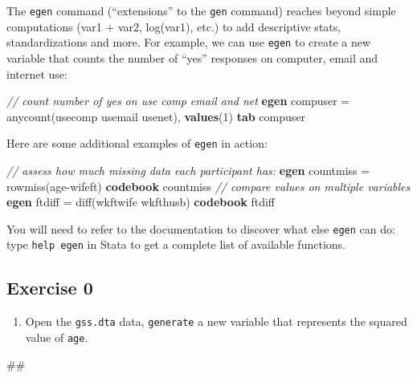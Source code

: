 \documentclass[
]{book}
\newenvironment{Shaded}{\begin{snugshade}}{\end{snugshade}}
\newcommand{\CommentTok}[1]{\textcolor[rgb]{0.56,0.35,0.01}{\textit{#1}}}
\newcommand{\FunctionTok}[1]{\textcolor[rgb]{0.00,0.00,0.00}{#1}}
\newcommand{\KeywordTok}[1]{\textcolor[rgb]{0.13,0.29,0.53}{\textbf{#1}}}
\newcommand{\NormalTok}[1]{#1}
\providecommand{\tightlist}{%
  \setlength{\itemsep}{0pt}\setlength{\parskip}{0pt}}
\begin{document}
The \texttt{egen} command (``extensions'' to the \texttt{gen} command) reaches beyond simple computations (var1 + var2, log(var1), etc.) to add descriptive stats, standardizations and more. For example, we can use \texttt{egen} to create a new variable that counts the number of ``yes'' responses on computer, email and internet use:

\begin{Shaded}
\begin{Highlighting}[]
\CommentTok{// count number of yes on use comp email and net }
\KeywordTok{egen}\NormalTok{ compuser = }\FunctionTok{anycount}\NormalTok{(usecomp usemail usenet), }\KeywordTok{values}\NormalTok{(1)}
\KeywordTok{tab}\NormalTok{ compuser}
\end{Highlighting}
\end{Shaded}

Here are some additional examples of \texttt{egen} in action:

\begin{Shaded}
\begin{Highlighting}[]
\CommentTok{// assess how much missing data each participant has:}
\KeywordTok{egen}\NormalTok{ countmiss = }\FunctionTok{rowmiss}\NormalTok{(age{-}wifeft)}
\KeywordTok{codebook}\NormalTok{ countmiss}
\CommentTok{// compare values on multiple variables}
\KeywordTok{egen}\NormalTok{ ftdiff = }\FunctionTok{diff}\NormalTok{(wkftwife wkfthusb)}
\KeywordTok{codebook}\NormalTok{ ftdiff}
\end{Highlighting}
\end{Shaded}

You will need to refer to the documentation to discover what else \texttt{egen} can do: type \texttt{help\ egen} in Stata to get a complete list of available functions.

\hypertarget{exercise-0-6}{%
\subsection{Exercise 0}\label{exercise-0-6}}

\begin{enumerate}
\def\labelenumi{\arabic{enumi}.}
\tightlist
\item
  Open the \texttt{gss.dta} data, \texttt{generate} a new variable that represents the squared value of \texttt{age}.
\end{enumerate}

\begin{Shaded}
\begin{Highlighting}[]
\NormalTok{\#\#}
\end{Highlighting}
\end{Shaded}
\end{document}
